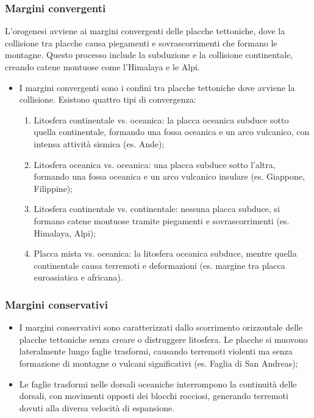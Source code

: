 \documentclass{article}
\begin{document}
\subsubsection{Margini convergenti}
L'orogenesi avviene ai margini convergenti delle placche tettoniche, dove la collisione tra
placche causa piegamenti e sovrascorrimenti che formano le montagne. Questo processo include la
subduzione e la collisione continentale, creando catene montuose come l'Himalaya e le Alpi.
\begin{itemize}
    \item I margini convergenti sono i confini tra placche tettoniche dove avviene la collisione.
        Esistono quattro tipi di convergenza:
        \begin{enumerate}
            \item Litosfera continentale vs. oceanica: la placca oceanica subduce sotto quella
                continentale, formando una fossa oceanica e un arco vulcanico, con intensa
                attività sismica (es. Ande);
            \item Litosfera oceanica vs. oceanica: una placca subduce sotto l'altra, formando
                una fossa oceanica e un arco vulcanico insulare (es. Giappone, Filippine);
            \item Litosfera continentale vs. continentale: nessuna placca subduce, si formano
                catene montuose tramite piegamenti e sovrascorrimenti (es. Himalaya, Alpi);
            \item Placca mista vs. oceanica: la litosfera oceanica subduce, mentre quella
                continentale causa terremoti e deformazioni (es. margine tra placca
                euroasiatica e africana).
        \end{enumerate}
\end{itemize}

\subsubsection{Margini conservativi}
\begin{itemize}
    \item I margini conservativi sono caratterizzati dallo scorrimento orizzontale delle placche
        tettoniche senza creare o distruggere litosfera. Le placche si muovono lateralmente
        lungo faglie trasformi, causando terremoti violenti ma senza formazione di montagne o
        vulcani significativi (es. Faglia di San Andreas);
    \item Le faglie trasformi nelle dorsali oceaniche interrompono la continuità delle dorsali,
        con movimenti opposti dei blocchi rocciosi, generando terremoti dovuti alla diversa
        velocità di espansione.
\end{itemize}
\end{document}

